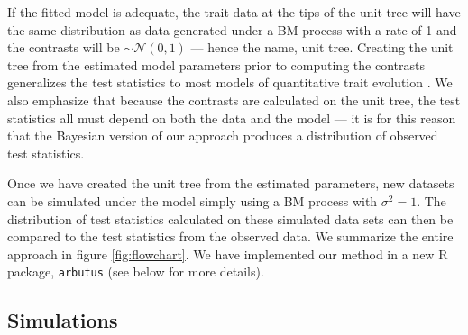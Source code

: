 \documentclass[a4paper,11pt]{article}
\begin{document}

If the fitted model is adequate, the trait data at the tips of the unit tree will have the same distribution as data generated under a BM process with a rate of 1 and the contrasts will be $\sim \mathcal{N}(0,1)$ --- hence the name, unit tree. Creating the unit tree from the estimated model parameters prior to computing the contrasts generalizes the test statistics to most models of quantitative trait evolution \citep[but see][for an exception]{Landis2012}. We also emphasize that because the contrasts are calculated on the unit tree, the test statistics all must depend on both the data and the model --- it is for this reason that the Bayesian version of our approach produces a distribution of observed test statistics.

Once we have created the unit tree from the estimated parameters, new datasets can be simulated under the model simply using a BM process with $\sigma^2 = 1$. The distribution of test statistics calculated on these simulated data sets can then be compared to the test statistics from the observed data. We summarize the entire approach in figure \ref{fig:flowchart}. We have implemented our method in a new R package, \texttt{arbutus} (see below for more details).

\subsection{Simulations}
\end{document}
